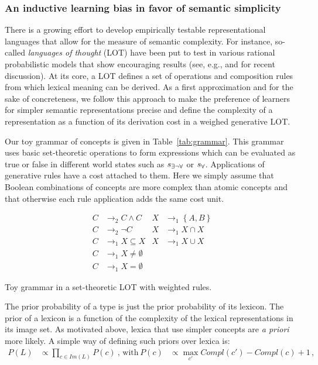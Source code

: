 \documentclass[a4paper]{article}
\newcommand{\set}[1]{\left\{#1\right\}}
\newcommand{\state}{\ensuremath{s}\xspace}		%
\newcommand{\mystate}[1]{\ensuremath{\state_{\text{#1}}}\xspace} %
\newcommand{\ssome}{\mystate{\ensuremath{\exists\neg\forall}}}
\newcommand{\sall}{\mystate{\ensuremath{\forall}}}
\begin{document}
\subsubsection{An inductive learning bias in favor of semantic simplicity}
There is a growing effort to develop empirically  testable representational  languages that allow for the measure of semantic complexity. For instance, so-called {\em languages of thought} (LOT) have been put to test in various rational probabilistic models that show encouraging results (see, e.g., \citealt{katz+etal:2008, piantadosi+etal:underreview, piantadosi+etal:2012a} and \citealt{piantadosi+jacobs:2016} for recent discussion). At its core, a LOT defines a set of operations and composition rules from which lexical meaning can be derived. As a first approximation and for the sake of concreteness, we follow this approach to make the preference of learners for simpler semantic representations precise and define the complexity of a representation as a function of its derivation cost in a weighed generative LOT.

Our toy grammar of concepts is given in Table~\ref{tab:grammar}. This grammar uses basic set-theoretic operations to form expressions which can be evaluated as true or false in different world states such as $\ssome$ or $\sall$. Applications of generative  rules have a cost attached to them. Here we simply assume that Boolean combinations of concepts are more complex than atomic concepts and that otherwise each rule application adds the same cost unit.
\begin{table}
  \centering
  \begin{align*}
    C & \rightarrow_2 C \wedge C 
    & 
    X & \rightarrow_1 \set{A,B} \\
    C & \rightarrow_2 \neg C 
    & 
    X & \rightarrow_1 X \cap X \\
    C & \rightarrow_1 X \subseteq X
    & 
    X & \rightarrow_1 X \cup X \\
    C & \rightarrow_1 X \neq \emptyset \\
    C & \rightarrow_1 X = \emptyset     
  \end{align*}
  \caption{Toy grammar in a set-theoretic LOT with weighted rules.}
  \label{tab:grammar}
\end{table}


The prior probability of a type is just the prior probability of its lexicon. The prior of a lexicon is a function of the complexity of the lexical representations in its image set. As motivated above, lexica that use simpler concepts are \emph{a priori} more likely. A simple way of defining such priors over lexica is:
\begin{align*}
  P(L)  & \propto \prod_{c \in Im(L)} P(c)   \ \text{, with} & 
  P(c) & \propto \max_{c'}Compl(c') - Compl(c) + 1\,,
\end{align*}
\end{document}
